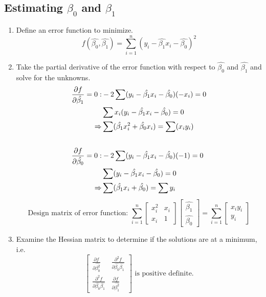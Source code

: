\documentclass[a4paper]{article}
\begin{document}
\subsection{Estimating \texorpdfstring{$\beta_{0}$}{beta0} and \texorpdfstring{$\beta_{1}$}{beta1}}
\begin{enumerate}
    \item Define an error function to minimize.
    $$f(\hat{\beta_{0}}, \hat{\beta_{1}}) = \sum_{i=1}^{n}(y_{i}-\hat{\beta_{1}}x_{i}-\hat{\beta_{0}})^{2}
    $$
    \item Take the partial derivative of the error function with respect to $\hat{\beta_{0}}$ and $\hat{\beta_{1}}$ and solve for the unknowns.
    \begin{align*}
    \frac{\partial f}{\partial \hat{\beta_{1}}} = 0: &-2\sum (y_{i}-\hat{\beta_{1}}x_{i}-\hat{\beta_{0}})(-x_{i}) = 0\\
    & \sum x_{i}(y_{i}-\hat{\beta_{1}}x_{i}-\hat{\beta_{0}}) = 0\\
    \xRightarrow{}&\sum(\hat{\beta_{1}}x_{i}^{2} +\hat{\beta_{0}}x_{i}) = \sum(x_{i}y_{i})\\
    \mbox{}\\
    \frac{\partial f}{\partial \hat{\beta_{0}}} = 0: &-2\sum (y_{i}-\hat{\beta_{1}}x_{i}-\hat{\beta_{0}})(-1) = 0\\
    &\sum(y_{i}-\hat{\beta_{1}}x_{i}-\hat{\beta_{0}}) = 0\\
    \xRightarrow{} &\sum(\hat{\beta_{1}}x_{i}+\hat{\beta_{0}}) = \sum y_{i}\\
    \end{align*}
    $$
    \text{Design matrix of error function: }\sum_{i=1}^{n}
    \begin{bmatrix}
        x_{i}^{2} & x_{i}\\
        x_{i} & 1
    \end{bmatrix}
    \begin{bmatrix}
        \hat{\beta_{1}}\\
        \hat{\beta_{0}}
    \end{bmatrix}
    =
    \sum_{i=1}^{n}
    \begin{bmatrix}
        x_{i}y_{i}\\
        y_{i}
    \end{bmatrix}
    $$
    \item Examine the Hessian matrix to determine if the solutions are at a minimum, i.e.
    $$
    \begin{bmatrix}
        \displaystyle \frac{\partial f}{\partial \hat{\beta_{0}^{2}}} \ & \displaystyle \frac{\partial^{2} f}{\partial \hat{\beta_{0}}\hat{\beta_{1}}} \\[12pt]
        \displaystyle \frac{\partial^{2} f}{\partial \hat{\beta_{0}}\hat{\beta_{1}}} & \displaystyle \frac{\partial f}{\partial \hat{\beta_{1}^{2}}}
    \end{bmatrix}\text{ is positive definite.}
    $$
\end{enumerate}
\end{document}

